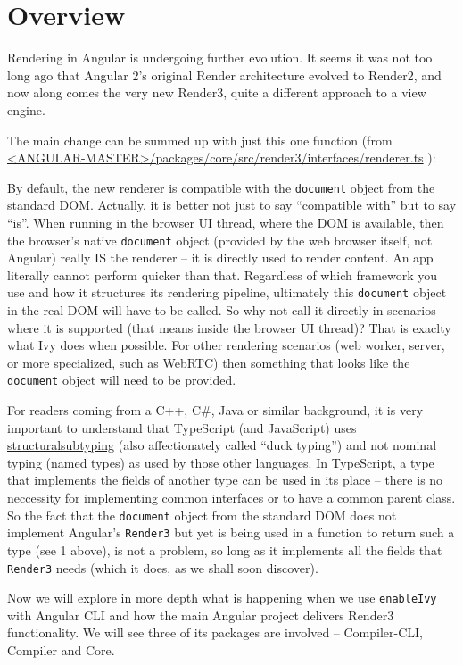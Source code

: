 \section{Overview}

Rendering in Angular is undergoing further evolution. It seems it was not too long ago
that Angular 2’s original Render architecture evolved to Render2, and now along
comes the very new Render3, quite a different approach to a view engine.

The main change can be summed up with just this one function
(from
\href{https://github.com/angular/angular/blob/master/packages/core/src/render3/interfaces/renderer.ts}
{<ANGULAR-MASTER>/packages/core/src/render3/interfaces/renderer.ts}
):



By default, the new renderer is compatible with the
\texttt{document}
object from the
standard DOM. Actually, it is better not just to say “compatible with” but to say “is”.
When running in the browser UI thread, where the DOM is available, then the
browser’s native
\texttt{document}
object (provided by the web browser itself, not Angular)
really IS the renderer – it is directly used to render content. An app literally cannot
perform quicker than that. Regardless of which framework you use and how it
structures its rendering pipeline, ultimately this
\texttt{document}
object in the real DOM will
have to be called. So why not call it directly in scenarios where it is supported (that
means inside the browser UI thread)? That is exaclty what Ivy does when possible.
For other rendering scenarios (web worker, server, or more specialized, such as
WebRTC) then something that looks like the
\texttt{document}
object will need to be provided.

For readers coming from a C++, C\#, Java or similar background, it is very important
to understand that TypeScript (and JavaScript) uses
\url{structuralsubtyping}
(also
affectionately called “duck typing”) and not nominal typing (named types) as used by
those other languages. In TypeScript, a type that implements the fields of another
type can be used in its place – there is no neccessity for implementing common
interfaces or to have a common parent class. So the fact that the
\texttt{document}
object
from the standard DOM does not implement Angular’s
\texttt{Render3}
but yet is being used
in a function to return such a type (see
1
above), is not a problem, so long as it
implements all the fields that
\texttt{Render3}
needs (which it does, as we shall soon
discover).

Now we will explore in more depth what is happening when we use
\texttt{enableIvy}
with
Angular CLI and how the main Angular project delivers Render3 functionality. We will
see three of its packages are involved – Compiler-CLI, Compiler and Core.


